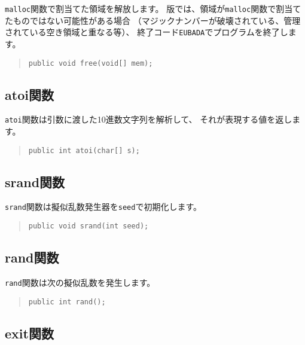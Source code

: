 \verb/malloc/関数で割当てた領域を解放します。
\tac 版では、領域が\verb/malloc/関数で割当てたものではない可能性がある場合
（マジックナンバーが破壊されている、管理されている空き領域と重なる等）、
終了コード\verb/EUBADA/でプログラムを終了します。

\begin{quote}
\begin{verbatim}
public void free(void[] mem);
\end{verbatim}
\end{quote}

\subsection{atoi関数}

\verb/atoi/関数は引数に渡した10進数文字列を解析して、
それが表現する値を返します。

\begin{quote}
\begin{verbatim}
public int atoi(char[] s);
\end{verbatim}
\end{quote}

\subsection{srand関数}

\verb/srand/関数は擬似乱数発生器を\verb/seed/で初期化します。

\begin{quote}
\begin{verbatim}
public void srand(int seed);
\end{verbatim}
\end{quote}

\subsection{rand関数}

\verb/rand/関数は次の擬似乱数を発生します。

\begin{quote}
\begin{verbatim}
public int rand();
\end{verbatim}
\end{quote}

\subsection{exit関数}

